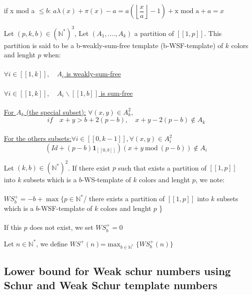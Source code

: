 \\\\if x mod a \(\leqslant b\):
\(a\lambda(x)+\pi(x)-a=a(\left\lfloor\dfrac{x}{a}\right\rfloor-1)+\text{x mod a}+a=x\)
\begin{definition}
Let \( (p,k,b) \in (\mathbb{N}^*)^3\), Let \((A_1,....,A_k)\) a partition of  \([\![1, p]\!]\).
This partition is said to be a b-weakly-sum-free template (b-WSF-template) of \(k\) colors and lenght \(p\) when:
\\\\
\underline{\(\forall i \in [\![1, k]\!], \quad A_i\) is weakly-sum-free}
\\\\
\underline{\(\forall i \in [\![1, k]\!], \quad A_i\backslash [\![1, b]\!]\) is sum-free}
\\\\
\underline{For \(A_k\) (the special subset):} \quad \(\forall (x,y) \in A_k^2,\)
\\
\[if \quad x+y>b+2(p-b),\quad x+y-2(p-b)\notin A_k\]
\\
\underline{For the others subsets:}\quad \(\forall i \in [\![0,k-1]\!], \forall(x,y) \in A_i^2\)
\\
\[
(Id+(p-b)\mathbf{1}_{ [\![0,b]\!]})(x+y ~\text{mod}~ (p-b)) \notin A_i
\]
\end{definition}

\begin{definition}
Let \( (k,b) \in (\mathbb{N}^*)^2\). If there exist \(p\) such that exists a partition of \([\![1, p]\!]\) into \(k\)
subsets which is a \(b\)-WS-template of \(k\) colors and lenght \(p\), we note:
\\\\\(WS_b^+=-b+\max \{p\in \mathbb{N}^*\)/ there exists a partition of \([\![1, p]\!]\) into \(k\) subsets which is a
\(b\)-WSF-template of \(k\) colors and lenght \(p\) \}
\\\\
If this \(p\) does not exist, we set \(WS_b^+= 0\)
\end{definition}

\begin{definition}
Let \( n \in \mathbb{N}^*\), we define \(WS^+(n)\)=\(\max_{b\in \mathbb{N}^*} \{WS_b^+(n)\}\)
\end{definition}


\subsection{Lower bound for Weak schur numbers using Schur and Weak Schur template numbers}


